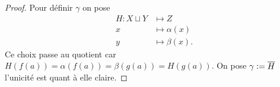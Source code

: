 \documentclass[12pt]{book}
\newcommand{\defeq}{\vcentcolon=}
\theoremstyle{definition}
\theoremstyle{remark}
\begin{document}
	\begin{proof}
		Pour définir $\gamma$ on pose  
		\begin{align*}
			H : X \sqcup Y &\longmapsto Z \\
			x &\longmapsto \alpha(x) \\
			y &\longmapsto \beta(x)
		.\end{align*}
		Ce choix passe au quotient car $H(f(a)) = \alpha(f(a)) = \beta(g(a)) = H(g(a))$. On pose  $\gamma \defeq \overline{H}$ l'unicité est quant à elle claire.
	\end{proof}
\end{document}
